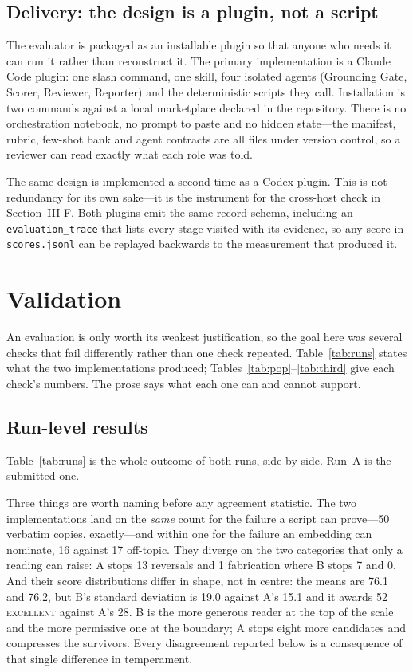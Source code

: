 \documentclass[conference]{IEEEtran}
\begin{document}
\subsection{Delivery: the design is a plugin, not a script}
The evaluator is packaged as an installable plugin so that anyone who
needs it can run it rather than reconstruct it. The primary
implementation is a Claude Code plugin: one slash command, one skill,
four isolated agents (Grounding Gate, Scorer, Reviewer, Reporter) and
the deterministic scripts they call. Installation is two commands
against a local marketplace declared in the repository. There is no
orchestration notebook, no prompt to paste and no hidden state---the
manifest, rubric, few-shot bank and agent contracts are all files under
version control, so a reviewer can read exactly what each role was
told.

The same design is implemented a second time as a Codex plugin. This is
not redundancy for its own sake---it is the instrument for the
cross-host check in Section~III-F. Both plugins emit the same record
schema, including an \texttt{evaluation\_trace} that lists every stage
visited with its evidence, so any score in \texttt{scores.jsonl} can be
replayed backwards to the measurement that produced it.

\section{Validation}

An evaluation is only worth its weakest justification, so the goal here
was several checks that fail differently rather than one check repeated.
Table~\ref{tab:runs} states what the two implementations produced;
Tables~\ref{tab:pop}--\ref{tab:third} give each check's numbers. The
prose says what each one can and cannot support.

\subsection{Run-level results}
Table~\ref{tab:runs} is the whole outcome of both runs, side by side.
Run~A is the submitted one.

Three things are worth naming before any agreement statistic. The two
implementations land on the \emph{same} count for the failure a script
can prove---50 verbatim copies, exactly---and within one for the failure
an embedding can nominate, 16 against 17 off-topic. They diverge on the
two categories that only a reading can raise: A stops 13 reversals and
1 fabrication where B stops 7 and 0. And their score distributions
differ in shape, not in centre: the means are 76.1 and 76.2, but B's
standard deviation is 19.0 against A's 15.1 and it awards 52
\textsc{excellent} against A's 28. B is the more generous reader at the
top of the scale and the more permissive one at the boundary; A stops
eight more candidates and compresses the survivors. Every disagreement
reported below is a consequence of that single difference in
temperament.
\end{document}
